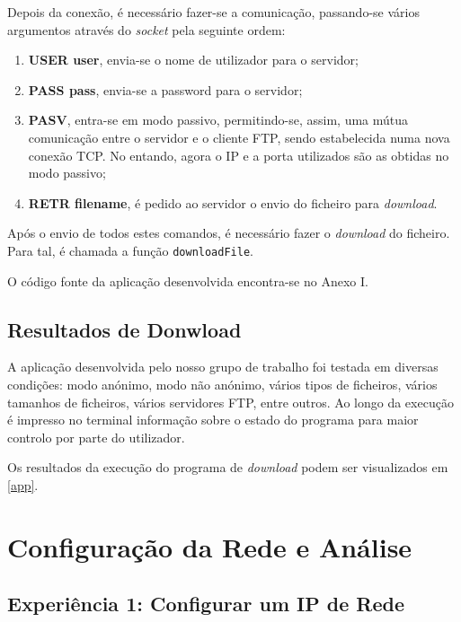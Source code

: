 \documentclass[article, a4paper, 11pt, oneside]{memoir}
\begin{document}
Depois da conexão, é necessário fazer-se a comunicação, passando-se vários argumentos através
do \textit{socket} pela seguinte ordem:

\begin{enumerate}
  \item \textbf{USER user}, envia-se o nome de utilizador para o servidor;
  \item \textbf{PASS pass}, envia-se a password para o servidor;
  \item \textbf{PASV}, entra-se em modo passivo, permitindo-se, assim, uma mútua comunicação
entre o servidor e o cliente FTP, sendo estabelecida numa nova conexão TCP. No
entando, agora o IP e a porta utilizados são as obtidas no modo passivo;
  \item \textbf{RETR filename}, é pedido ao servidor o envio do ficheiro para \textit{download}.
\end{enumerate}

Após o envio de todos estes comandos, é necessário fazer o \textit{download} do ficheiro. Para tal,
é chamada a função \verb|downloadFile|.

O código fonte da aplicação desenvolvida encontra-se no Anexo I. 

\section{Resultados de Donwload}

A aplicação desenvolvida pelo nosso grupo de trabalho foi testada em diversas condições: modo
anónimo, modo não anónimo, vários tipos de ficheiros, vários tamanhos de ficheiros, vários
servidores FTP, entre outros. Ao longo da execução é impresso no terminal informação sobre o
estado do programa para maior controlo por parte do utilizador.

Os resultados da execução do programa de \textit{download} podem ser visualizados em \ref{app}.

\chapter[Configuração da Rede e Análise][Configuração da Rede e Análise]{Configuração da Rede e Análise} \label{\thechapter}

\section{\textbf{Experiência 1}: Configurar um IP de Rede}
\end{document}
